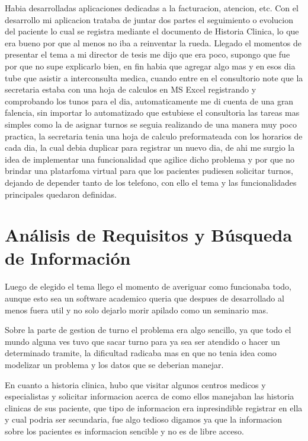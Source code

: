 Habia desarrolladas aplicaciones dedicadas a la facturacion, atencion, etc. Con 
el desarrollo mi aplicacion trataba de juntar dos partes el seguimiento o 
evolucion del paciente lo cual se registra mediante el documento de Historia 
Clinica, lo que era bueno por que al menos no iba a reinventar la rueda. Llegado 
el momentos de presentar el tema a mi director de tesis me dijo que era poco, 
supongo que fue por que no supe explicarlo bien, en fin habia que agregar algo 
mas y en esos dia tube que asistir a interconsulta medica, cuando entre en el 
consultorio note que la secretaria estaba con una hoja de calculos en MS Excel 
registrando y comprobando los tunos para el dia, automaticamente me di cuenta 
de una gran falencia, sin importar lo automatizado que estubiese el consultoria
las tareas mas simples como la de asignar turnos se seguia realizando de una 
manera muy poco practica, la secretaria tenia una hoja de calculo preformateada 
con los horarios de cada dia, la cual debia duplicar para registrar un nuevo dia,
de ahi me surgio la idea de implementar una funcionalidad que agilice dicho 
problema y por que no brindar una platarfoma virtual para que los pacientes 
pudiesen solicitar turnos, dejando de depender tanto de los telefono, con ello el 
tema y las funcionalidades principales quedaron definidas. 


\section{An\'alisis de Requisitos y Búsqueda de Informaci\'on}

Luego de elegido el tema llego el momento de averiguar como funcionaba todo, aunque
esto sea un software academico queria que despues de desarrollado al menos fuera 
util y no solo dejarlo morir apilado como un seminario mas.

Sobre la parte de gestion de turno el problema era algo sencillo, ya que todo el mundo 
alguna ves tuvo que sacar turno para ya sea ser atendido o hacer un determinado 
tramite, la dificultad radicaba mas en que no tenia idea como modelizar un 
problema y los datos que se deberian manejar. 

En cuanto a historia clinica, hubo que visitar algunos centros medicos y especialistas
 y solicitar informacion acerca de como ellos manejaban las historia clinicas de sus 
 paciente, que tipo de informacion era inpresindible registrar en ella y cual podria ser 
secundaria, fue algo tedioso digamos ya que la informacion sobre los pacientes es 
informacion sencible y no es de libre acceso. 

